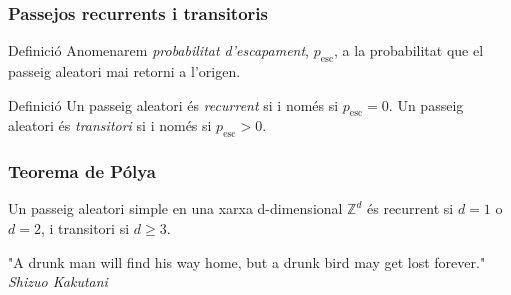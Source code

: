 \documentclass[aspectratio=169, 12pt]{beamer}
\begin{document}
\begin{frame}
	\frametitle{Passejos recurrents i transitoris}
	\begin{block}{Definició}
		Anomenarem \emph{probabilitat d'escapament}, $p_\text{esc}$, a la probabilitat que el passeig aleatori mai retorni a l'origen.
	\end{block} \pause
	\begin{block}{Definició}
		Un passeig aleatori és \emph{recurrent} si i només si $p_\text{esc}=0$. 
		Un passeig aleatori és \emph{transitori} si i només si $p_\text{esc}>0$.
	\end{block}
\end{frame}

\begin{frame}
	\frametitle{Teorema de Pólya}
	\begin{theorem}
		Un passeig aleatori simple en una xarxa d-dimensional $\mathbb{Z}^d$ és recurrent si $d=1$ o $d=2$, i transitori si $d\geq 3$.
	\end{theorem} \pause

	\begin{block}{ }
		"A drunk man will find his way home, but a drunk bird may get lost forever." \\
		\textit{Shizuo Kakutani}
	\end{block}
\end{frame}
\end{document}
